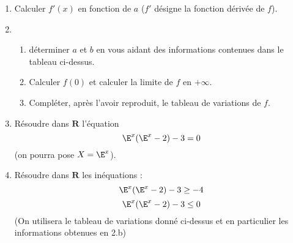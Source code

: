   \medskip
  \begin{enumerate}
      \item Calculer $f'(x)$ en fonction de $a$ ($f'$ désigne la fonction dérivée de $f$).
      \item \begin{enumerate}
             \item déterminer $a$ et $b$ en vous aidant des informations contenues dans le
              tableau ci-dessus.
             \item Calculer $f(0)$ et calculer la limite de $f$ en $+\infty$.
             \item Compléter, après l'avoir reproduit, le tableau de variations de $f$.
             \end{enumerate}
      \item Résoudre dans $\mathbf{R}$ l'équation 
      \[
          \E^x(\E^x-2)-3=0
      \]
      (on pourra pose $X=\E^x$).
      \item Résoudre dans $\mathbf{R}$ les inéquations : 
      \[
          \E^x(\E^x-2)-3\geq -4
      \]
      \[
          \E^x(\E^x-2)-3 \leq 0
      \]
       (On utilisera le tableau de variations donné ci-dessus et en particulier les
        informations obtenues en 2.b)
  \end{enumerate}

